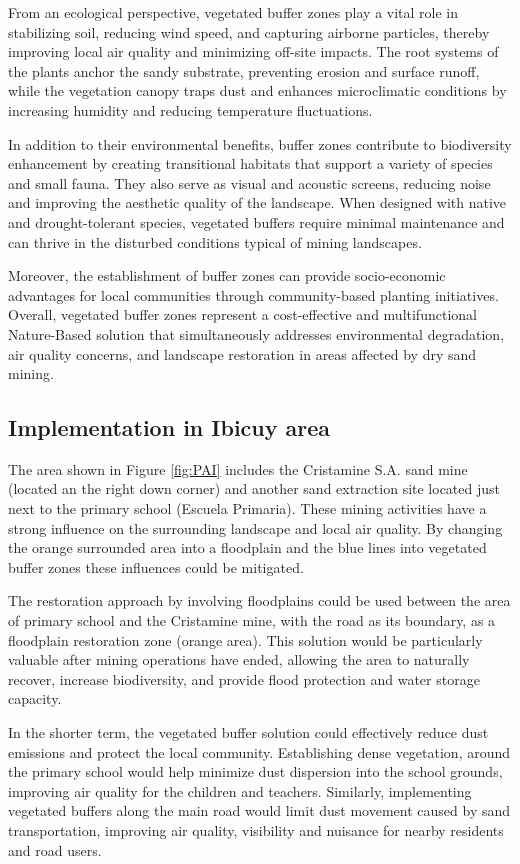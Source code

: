 From an ecological perspective, vegetated buffer zones play a vital role in stabilizing soil, reducing wind speed, and capturing airborne particles, thereby improving local air quality and minimizing off-site impacts. The root systems of the plants anchor the sandy substrate, preventing erosion and surface runoff, while the vegetation canopy traps dust and enhances microclimatic conditions by increasing humidity and reducing temperature fluctuations.

In addition to their environmental benefits, buffer zones contribute to biodiversity enhancement by creating transitional habitats that support a variety of species and small fauna. They also serve as visual and acoustic screens, reducing noise and improving the aesthetic quality of the landscape. When designed with native and drought-tolerant species, vegetated buffers require minimal maintenance and can thrive in the disturbed conditions typical of mining landscapes.

Moreover, the establishment of buffer zones can provide socio-economic advantages for local communities through community-based planting initiatives. Overall, vegetated buffer zones represent a cost-effective and multifunctional Nature-Based solution that simultaneously addresses environmental degradation, air quality concerns, and landscape restoration in areas affected by dry sand mining.

\subsection{Implementation in Ibicuy area}
The area shown in Figure \ref{fig:PAI} includes the Cristamine S.A. sand mine (located an the right down corner) and another sand extraction site located just next to the primary school (Escuela Primaria). These mining activities have a strong influence on the surrounding landscape and local air quality. By changing the orange surrounded area into a floodplain and the blue lines into vegetated buffer zones these influences could be mitigated. 

The restoration approach by involving floodplains could be used between the area of primary school and the Cristamine mine, with the road as its boundary, as a floodplain restoration zone (orange area). This solution would be particularly valuable after mining operations have ended, allowing the area to naturally recover, increase biodiversity, and provide flood protection and water storage capacity.

In the shorter term, the vegetated buffer solution could effectively reduce dust emissions and protect the local community. Establishing dense vegetation, around the primary school would help minimize dust dispersion into the school grounds, improving air quality for the children and teachers.
Similarly, implementing vegetated buffers along the main road would limit dust movement caused by sand transportation, improving air quality, visibility and nuisance for nearby residents and road users.

